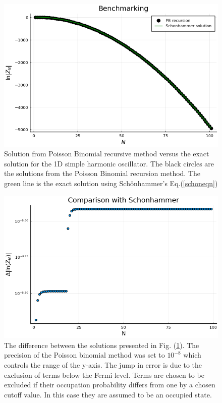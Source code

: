 \begin{figure}[H]
    \centering
    \includegraphics[scale=0.6]{figures/pdf/Benchmarking.png}
    \caption{Solution from Poisson Binomial recursive method versus the exact solution for the 1D simple harmonic oscillator. The black circles are the solutions from the Poisson Binomial recursion method. The green line is the exact solution using Sch\"onhammer's Eq.(\ref{schoneqn})}
    \label{fig: schon solution}
\end{figure}
\begin{figure}[H]
    \centering
    \includegraphics[scale=0.6]{figures/pdf/Benchdiff.png}
    \caption{The difference between the solutions presented in Fig. (\ref{fig: schon solution}). The precision of the Poisson binomial method was set to $10^{-8}$ which controls the range of the y-axis. The jump in error is due to the exclusion of terms below the Fermi level. Terms are chosen to be excluded if their occupation probability differs from one by a chosen cutoff value. In this case they are assumed to be an occupied state. }
    \label{fig: schon diff}
\end{figure}

